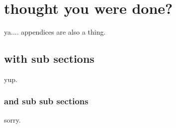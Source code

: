 \documentclass[12pt]{article}
\begin{document}

\begin{spacing}{0.5}
{\footnotesize	}
\end{spacing}

\appendix
\renewcommand\thesection{Appendix~\Alph{section}}
\section{thought you were done?}
\renewcommand\thesection{\Alph{section}}

ya.... appendices are also a thing.

\subsection{with sub sections}
yup.


\subsubsection{and sub sub sections}
sorry.

\theendnotes
\end{document}

